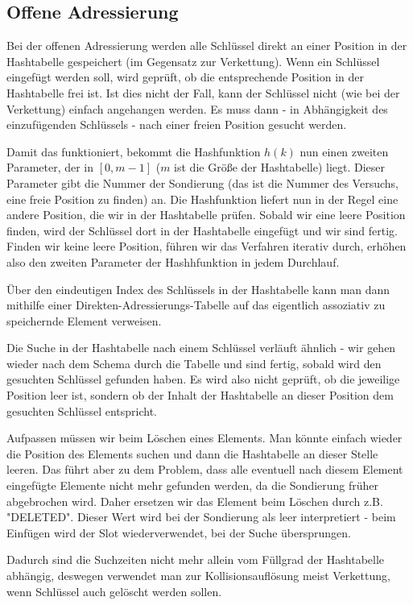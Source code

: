 \documentclass[12pt]{article}
\begin{document}
\subsection{Offene Adressierung}

Bei der offenen Adressierung werden alle Schlüssel direkt an einer Position in der Hashtabelle gespeichert (im Gegensatz zur Verkettung). Wenn ein Schlüssel eingefügt werden soll, wird geprüft, ob die entsprechende Position in der Hashtabelle frei ist. Ist dies nicht der Fall, kann der Schlüssel nicht (wie bei der Verkettung) einfach angehangen werden. Es muss dann - in Abhängigkeit des einzufügenden Schlüssels - nach einer freien Position gesucht werden.

Damit das funktioniert, bekommt die Hashfunktion $h(k)$ nun einen zweiten Parameter, der in $[0,m-1]$ ($m$ ist die Größe der Hashtabelle) liegt. Dieser Parameter gibt die Nummer der Sondierung (das ist die Nummer des Versuchs, eine freie Position zu finden) an. Die Hashfunktion liefert nun in der Regel eine andere Position, die wir in der Hashtabelle prüfen. Sobald wir eine leere Position finden, wird der Schlüssel dort in der Hashtabelle eingefügt und wir sind fertig. Finden wir keine leere Position, führen wir das Verfahren iterativ durch, erhöhen also den zweiten Parameter der Hashhfunktion in jedem Durchlauf.

Über den eindeutigen Index des Schlüssels in der Hashtabelle kann man dann mithilfe einer Direkten-Adressierungs-Tabelle auf das eigentlich assoziativ zu speichernde Element verweisen.

Die Suche in der Hashtabelle nach einem Schlüssel verläuft ähnlich - wir gehen wieder nach dem Schema durch die Tabelle und sind fertig, sobald wird den gesuchten Schlüssel gefunden haben. Es wird also nicht geprüft, ob die jeweilige Position leer ist, sondern ob der Inhalt der Hashtabelle an dieser Position dem gesuchten Schlüssel entspricht.

Aufpassen müssen wir beim Löschen eines Elements. Man könnte einfach wieder die Position des Elements suchen und dann die Hashtabelle an dieser Stelle leeren. Das führt aber zu dem Problem, dass alle eventuell nach diesem Element eingefügte Elemente nicht mehr gefunden werden, da die Sondierung früher abgebrochen wird. Daher ersetzen wir das Element beim Löschen durch z.B. "DELETED". Dieser Wert wird bei der Sondierung als leer interpretiert - beim Einfügen wird der Slot wiederverwendet, bei der Suche übersprungen.

Dadurch sind die Suchzeiten nicht mehr allein vom Füllgrad der Hashtabelle abhängig, deswegen verwendet man zur Kollisionsauflösung meist Verkettung, wenn Schlüssel auch gelöscht werden sollen.
\end{document}
